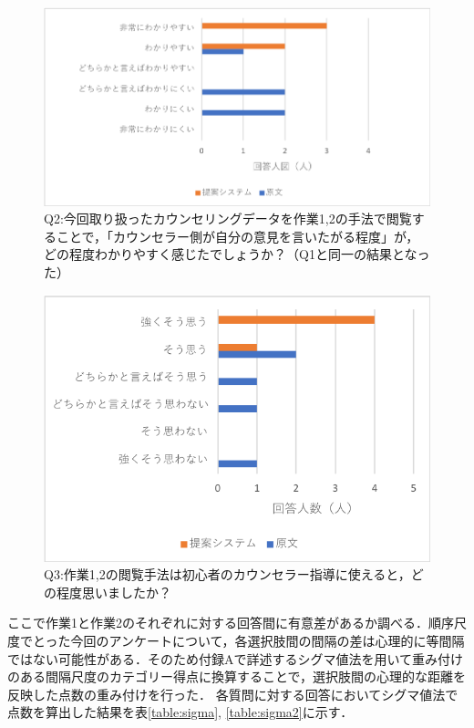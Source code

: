 \documentclass[shuuron]{kuee}
\begin{document}
\begin{figure}
  \begin{center}
    \includegraphics[width=\linewidth]{q1.png}
  \end{center}
  \caption{Q2:今回取り扱ったカウンセリングデータを作業1,2の手法で閲覧することで，「カウンセラー側が自分の意見を言いたがる程度」が，どの程度わかりやすく感じたでしょうか？（Q1と同一の結果となった）}
  \label{fig:q2}
\end{figure}

\begin{figure}
  \begin{center}
    \includegraphics[width=\linewidth]{q3.png}
  \end{center}
  \caption{Q3:作業1,2の閲覧手法は初心者のカウンセラー指導に使えると，どの程度思いましたか？}
  \label{fig:q3}
\end{figure}

ここで作業1と作業2のそれぞれに対する回答間に有意差があるか調べる．順序尺度でとった今回のアンケートについて，各選択肢間の間隔の差は心理的に等間隔ではない可能性がある．そのため付録Aで詳述するシグマ値法を用いて重み付けのある間隔尺度のカテゴリー得点に換算することで，選択肢間の心理的な距離を反映した点数の重み付けを行った．
各質問に対する回答においてシグマ値法で点数を算出した結果を表\ref{table:sigma}, \ref{table:sigma2}に示す．
\end{document}
